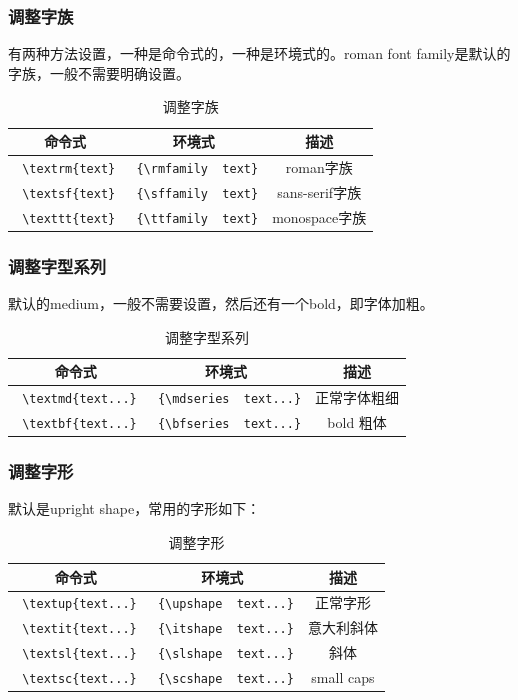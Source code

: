 \documentclass[12pt,oneside]{book}
\begin{document}
\begin{common-format}
\subsubsection{调整字族}
有两种方法设置，一种是命令式的，一种是环境式的。roman font family是默认的字族，一般不需要明确设置。
\begin{table}[H]
\centering
\label{tab:调整字族}
\begin{tabular}{|c|c|c|}
\hline
命令式 & 环境式 & 描述 \\
\hline
\verb+ \textrm{text}+ & \verb+ {\rmfamily  text}+  & roman字族 \\
\verb+ \textsf{text}+ & \verb+ {\sffamily  text}+  & sans-serif字族 \\
\verb+ \texttt{text}+ & \verb+ {\ttfamily  text}+  & monospace字族 \\
\hline
\end{tabular}
\caption{调整字族}
\end{table}

\subsubsection{调整字型系列}
默认的medium，一般不需要设置，然后还有一个bold，即字体加粗。
\begin{table}[H]
\centering
\label{tab:调整字型系列}
\begin{tabular}{|c|c|c|}
\hline
命令式 & 环境式 & 描述 \\
\hline
\verb+ \textmd{text...}+ & \verb+ {\mdseries  text...}+  & 正常字体粗细 \\  
\verb+ \textbf{text...}+ & \verb+ {\bfseries  text...}+  & bold 粗体 \\
\hline
\end{tabular}
\caption{调整字型系列}
\end{table}


\subsubsection{调整字形}
默认是upright shape，常用的字形如下：
\begin{table}[H]
\centering
\label{tab:调整字形}
\begin{tabular}{|c|c|c|}
\hline
命令式 & 环境式 & 描述 \\
\hline
\verb+ \textup{text...}+ & \verb+ {\upshape  text...}+  & 正常字形 \\  
\verb+ \textit{text...}+ & \verb+ {\itshape  text...}+  & 意大利斜体 \\
\verb+ \textsl{text...}+ & \verb+ {\slshape  text...}+  & 斜体 \\
\verb+ \textsc{text...}+ & \verb+ {\scshape  text...}+  & small caps \\
\hline
\end{tabular}
\caption{调整字形}
\end{table}



\end{common-format}
\end{document}
